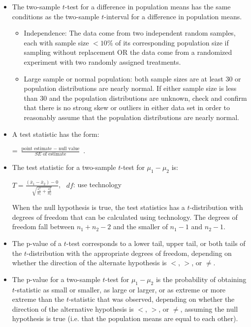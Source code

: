 \begin{itemize}
\item The two-sample $t$-test for a difference in population means has the same conditions as the two-sample $t$-interval for a difference in population means.  
\begin{itemize}
\item[1.] Independence:  The data come from two independent random samples, each with sample size $<10\%$ of its corresponding population size if sampling without replacement OR the data come from a randomized experiment with two randomly assigned treatments.
\item[2.] Large sample or normal population: both sample sizes are at least 30 or population distributions are nearly normal.  If either sample size is less than 30 and the population distributions are unknown, check and confirm that there is no strong skew or outliers in either data set in order to reasonably assume that the population distributions are nearly normal.
\end{itemize}

\item A test statistic has the form: 
\begin{center}
 = $\frac{\text{point estimate } - \text{ null value}}{SE \text{ of estimate}}$ .  
\end{center}
\item The test statistic for a two-sample $t$-test for $\mu_1-\mu_2$ is:
\begin{center}
$T = \frac{(\bar{x}_1 - \bar{x}_2) - 0}{\sqrt{\frac{s^2_1}{n_1}+\frac{s^2_2}{n_2}}}$, \ $df$: use technology
\end{center}
When the null hypothesis is true, the test statistics has a $t$-distribution with degrees of freedom that can be calculated using technology.  The degrees of freedom fall between $n_1 + n_2 - 2$ and the smaller of $n_1-1$ and $n_2-1$.

\item The p-value of a $t$-test corresponds to a lower tail, upper tail, or both tails of the $t$-distribution with the appropriate degrees of freedom, depending on whether the direction of the alternate hypothesis is $<$, $>$, or $\ne$.

\item The p-value for a two-sample $t$-test for $\mu_1-\mu_2$ is the probability of obtaining $t$-statistic as small or smaller, as large or larger, or as extreme or more extreme than the $t$-statistic that was observed, depending on whether the direction of the alternative hypothesis is $<$, $>$, or $\ne$, assuming the null hypothesis is true (i.e. that the population means are equal to each other).  


\end{itemize}
